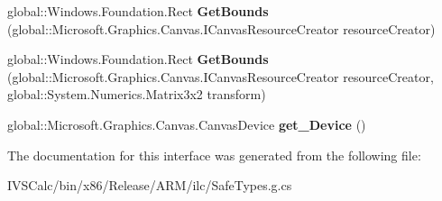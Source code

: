 \begin{DoxyCompactItemize}
\item 
\mbox{\label{interface_microsoft_1_1_graphics_1_1_canvas_1_1_geometry_1_1_i_canvas_gradient_mesh_a60495941d0df177b0c3211c88f21395d}} 
global\+::\+Windows.\+Foundation.\+Rect {\bfseries Get\+Bounds} (global\+::\+Microsoft.\+Graphics.\+Canvas.\+I\+Canvas\+Resource\+Creator resource\+Creator)
\item 
\mbox{\label{interface_microsoft_1_1_graphics_1_1_canvas_1_1_geometry_1_1_i_canvas_gradient_mesh_af752134439dc779ececd8c807383c753}} 
global\+::\+Windows.\+Foundation.\+Rect {\bfseries Get\+Bounds} (global\+::\+Microsoft.\+Graphics.\+Canvas.\+I\+Canvas\+Resource\+Creator resource\+Creator, global\+::\+System.\+Numerics.\+Matrix3x2 transform)
\item 
\mbox{\label{interface_microsoft_1_1_graphics_1_1_canvas_1_1_geometry_1_1_i_canvas_gradient_mesh_a68a310ad09ab7904bbc54422f689cf20}} 
global\+::\+Microsoft.\+Graphics.\+Canvas.\+Canvas\+Device {\bfseries get\+\_\+\+Device} ()
\end{DoxyCompactItemize}


The documentation for this interface was generated from the following file\+:\begin{DoxyCompactItemize}
\item 
I\+V\+S\+Calc/bin/x86/\+Release/\+A\+R\+M/ilc/Safe\+Types.\+g.\+cs\end{DoxyCompactItemize}

